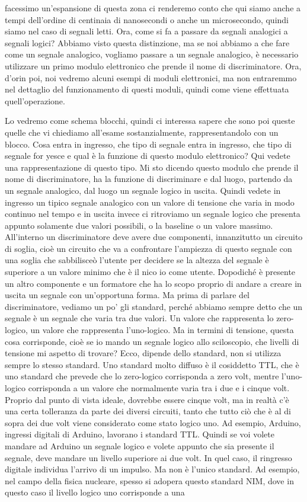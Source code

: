 facessimo un'espansione di questa zona ci renderemo conto che qui siamo anche a tempi dell'ordine di centinaia di nanosecondi o anche un microsecondo, quindi siamo nel caso di segnali letti. Ora, come si fa a passare da segnali analogici a segnali logici? Abbiamo visto questa distinzione, ma se noi abbiamo a che fare come un segnale analogico, vogliamo passare a un segnale analogico, è necessario utilizzare un primo modulo elettronico che prende il nome di discriminatore. Ora, d'orin poi, noi vedremo alcuni esempi di moduli elettronici, ma non entraremmo nel dettaglio del funzionamento di questi moduli, quindi come viene effettuata quell'operazione. 

Lo vedremo come schema blocchi, quindi ci interessa sapere che sono poi queste quelle che vi chiediamo all'esame sostanzialmente, rappresentandolo con un blocco. Cosa entra in ingresso, che tipo di segnale entra in ingresso, che tipo di segnale for yesce e qual è la funzione di questo modulo elettronico? Qui vedete una rappresentazione di questo tipo. Mi sto dicendo questo modulo che prende il nome di discriminatore, ha la funzione di discriminare e dal luogo, partendo da un segnale analogico, dal luogo un segnale logico in uscita. Quindi vedete in ingresso un tipico segnale analogico con un valore di tensione che varia in modo continuo nel tempo e in uscita invece ci ritroviamo un segnale logico che presenta appunto solamente due valori possibili, o la baseline o un valore massimo. All'interno un discriminatore deve avere due componenti, innanzitutto un circuito di soglia, cioè un circuito che va a confrontare l'ampiezza di questo segnale con una soglia che sabbilisceò l'utente per decidere se la altezza del segnale è superiore a un valore minimo che è il nico io come utente. Dopodiché è presente un altro componente e un formatore che ha lo scopo proprio di andare a creare in uscita un segnale con un'opportuna forma. Ma prima di parlare del discriminatore, vediamo un po' gli standard, perché abbiamo sempre detto che un segnale è un segnale che varia tra due valori. Un valore che rappresenta lo zero-logico, un valore che rappresenta l'uno-logico. Ma in termini di tensione, questa cosa corrisponde, cioè se io mando un segnale logico allo sciloscopio, che livelli di tensione mi aspetto di trovare? Ecco, dipende dello standard, non si utilizza sempre lo stesso standard. Uno standard molto diffuso è il cosiddetto TTL, che è uno standard che prevede che lo zero-logico corrisponda a zero volt, mentre l'uno-logico corrisponda a un valore che normalmente varia tra i due e i cinque volt. Proprio dal punto di vista ideale, dovrebbe essere cinque volt, ma in realtà c'è una certa tolleranza da parte dei diversi circuiti, tanto che tutto ciò che è al di sopra dei due volt viene considerato come stato logico uno. Ad esempio, Arduino, ingressi digitali di Arduino, lavorano i standard TTL. Quindi se voi volete mandare ad Arduino un segnale logico e volete appunto che sia presente il segnale, deve mandare un livello superiore ai due volt. In quel caso, il ringresso digitale individua l'arrivo di un impulso. Ma non è l'unico standard. Ad esempio, nel campo della fisica nucleare, spesso si adopera questo standard NIM, dove in questo caso il livello logico uno corrisponde a una 